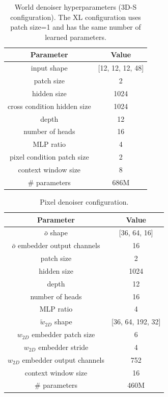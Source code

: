 \documentclass{article}
\theoremstyle{plain}
\theoremstyle{definition}
\theoremstyle{remark}
\begin{document}
\begin{table}[htb!]
\centering
\caption{World denoiser hyperparameters (3D-S configuration). The XL configuration uses patch size=1 and has the same number of learned parameters.}
\begin{tabular}{cc}\toprule  
Parameter & Value \\
\midrule
input shape & [12, 12, 12, 48] \\
patch size & 2 \\
hidden size & 1024 \\
cross condition hidden size & 1024 \\
depth & 12 \\
number of heads & 16 \\
MLP ratio & 4 \\
pixel condition patch size & 2 \\
context window size & 8 \\
\# parameters & 686M \\
\bottomrule
\end{tabular}
\label{table:world-denoiser}
\end{table}

\begin{table}[htb!]
\centering
\caption{Pixel denoiser configuration.}
\begin{tabular}{cc}\toprule  
Parameter & Value \\
\midrule
$\bar{o}$ shape & [36, 64, 16] \\
$\bar{o}$ embedder output channels & 16 \\
patch size & 2 \\
hidden size & 1024 \\
depth & 12 \\
number of heads & 16 \\
MLP ratio & 4 \\
$\tilde{w}_{2D}$ shape & [36, 64, 192, 32] \\
${w}_{2D}$ embedder patch size & 6 \\
${w}_{2D}$ embedder stride & 4 \\
${w}_{2D}$ embedder output channels & 752 \\
context window size & 16 \\
\# parameters & 460M \\

\bottomrule
\end{tabular}
\label{table:pixel-denoiser}
\end{table}
\end{document}
